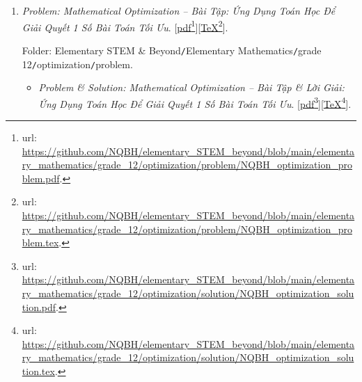 \documentclass[12pt,twoside]{book}
\begin{document}
\begin{enumerate}
	Folder: {\sf Elementary STEM \& Beyond{\tt/}Elementary Mathematics{\tt/}grade 12{\tt/}discrete random variable{\tt/}problem}.
	\begin{itemize}
		\item {\it Problem \& Solution: Discrete Random Variable \& Its Characteristics -- Bài Tập \& Lời Giải: Biến Ngẫu Nhiên Rời Rạc. Các Số Đặc Trưng Của Biến Ngẫu Nhiên Rời Rạc}. [\href{https://github.com/NQBH/elementary_STEM_beyond/blob/main/elementary_mathematics/grade_12/discrete_random_variable/solution/NQBH_discrete_random_variable_solution.pdf}{pdf}\footnote{{\sc url}: \url{https://github.com/NQBH/elementary_STEM_beyond/blob/main/elementary_mathematics/grade_12/discrete_random_variable/solution/NQBH_discrete_random_variable_solution.pdf}.}][\href{https://github.com/NQBH/elementary_STEM_beyond/blob/main/elementary_mathematics/grade_12/discrete_random_variable/solution/NQBH_discrete_random_variable_solution.tex}{\TeX}\footnote{{\sc url}: \url{https://github.com/NQBH/elementary_STEM_beyond/blob/main/elementary_mathematics/grade_12/discrete_random_variable/solution/NQBH_discrete_random_variable_solution.tex}.}].
		
		Folder: {\sf Elementary STEM \& Beyond{\tt/}Elementary Mathematics{\tt/}grade 12{\tt/}discrete random variable{\tt/}solution}.
	\end{itemize}
	\item {\it Problem: Mathematical Optimization -- Bài Tập: Ứng Dụng Toán Học Để Giải Quyết 1 Số Bài Toán Tối Ưu}. [\href{https://github.com/NQBH/elementary_STEM_beyond/blob/main/elementary_mathematics/grade_12/optimization/problem/NQBH_optimization_problem.pdf}{pdf}\footnote{{\sc url}: \url{https://github.com/NQBH/elementary_STEM_beyond/blob/main/elementary_mathematics/grade_12/optimization/problem/NQBH_optimization_problem.pdf}.}][\href{https://github.com/NQBH/elementary_STEM_beyond/blob/main/elementary_mathematics/grade_12/optimization/problem/NQBH_optimization_problem.tex}{\TeX}\footnote{{\sc url}: \url{https://github.com/NQBH/elementary_STEM_beyond/blob/main/elementary_mathematics/grade_12/optimization/problem/NQBH_optimization_problem.tex}.}].
	
	Folder: {\sf Elementary STEM \& Beyond{\tt/}Elementary Mathematics{\tt/}grade 12{\tt/}optimization{\tt/}problem}.
	\begin{itemize}
		\item {\it Problem \& Solution: Mathematical Optimization -- Bài Tập \& Lời Giải: Ứng Dụng Toán Học Để Giải Quyết 1 Số Bài Toán Tối Ưu}. [\href{https://github.com/NQBH/elementary_STEM_beyond/blob/main/elementary_mathematics/grade_12/optimization/solution/NQBH_optimization_solution.pdf}{pdf}\footnote{{\sc url}: \url{https://github.com/NQBH/elementary_STEM_beyond/blob/main/elementary_mathematics/grade_12/optimization/solution/NQBH_optimization_solution.pdf}.}][\href{https://github.com/NQBH/elementary_STEM_beyond/blob/main/elementary_mathematics/grade_12/optimization/solution/NQBH_optimization_solution.tex}{\TeX}\footnote{{\sc url}: \url{https://github.com/NQBH/elementary_STEM_beyond/blob/main/elementary_mathematics/grade_12/optimization/solution/NQBH_optimization_solution.tex}.}].
		

\end{itemize}
\end{enumerate}
\end{document}
